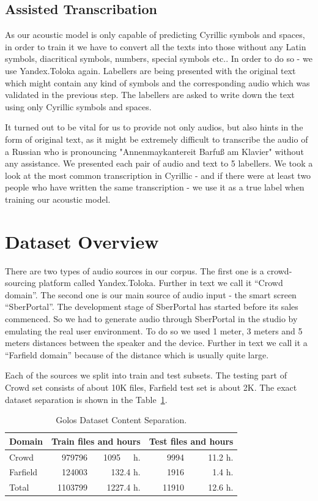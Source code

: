 \documentclass[a4paper]{article}
\begin{document}
\subsection{Assisted Transcribation}
As our acoustic model is only capable of predicting Cyrillic symbols and spaces, in order to train it we have to convert all the texts into those without any Latin symbols, diacritical symbols, numbers, special symbols etc.. In order to do so - we use Yandex.Toloka again. Labellers are being presented with the original text which might contain any kind of symbols and the corresponding audio which was validated in the previous step. The labellers are asked to write down the text using only Cyrillic symbols and spaces. 

It turned out to be vital for us to provide not only audios, but also hints in the form of original text, as it might be extremely difficult to transcribe the audio of a Russian who is pronouncing "Annenmaykantereit Barfuß am Klavier"  without any assistance. We presented each pair of audio and text to 5 labellers. We took a look at the most common transcription in Cyrillic - and if there were at least two people who have written the same transcription - we use it as a true label when training our acoustic model.


\section{Dataset Overview}

There are two types of audio sources in our corpus. The first one is a crowd-sourcing platform called Yandex.Toloka. Further in text we call it “Crowd domain”. The second one is our main source of audio input - the smart screen “SberPortal”. The development stage of SberPortal has started before its sales commenced. So we had to generate audio through SberPortal in the studio by emulating the real user environment. To do so we used 1 meter, 3 meters and 5 meters distances between the speaker and the device. Further in text we call it a “Farfield domain” because of the distance which is usually quite large.

Each of the sources we split into train and test subsets. The testing part of Crowd set consists of about 10K files, Farfield test set is about 2K. The exact dataset separation is shown in the Table~\ref{tab:dataset_separation}. 

\begin{table}[th]
  \caption{Golos Dataset Content Separation.}
  \label{tab:dataset_separation}
  \centering
  \begin{tabular}{ l|r|r|r|r }
    \toprule
    \multicolumn{1}{l|}{\textbf{Domain}} & \multicolumn{2}{c|}{\textbf{Train files and hours}} & \multicolumn{2}{c}{\textbf{Test files and hours}} \\
    \midrule
    Crowd  & 979796 & 1095~~~h.  & 9994 & 11.2 h. \\
    Farfield & 124003 & 132.4 h. &  1916 & 1.4 h. \\
    \bottomrule
    Total  & 1103799 & 1227.4 h. & 11910 & 12.6 h. \\
  \end{tabular}
\end{table}
\end{document}
